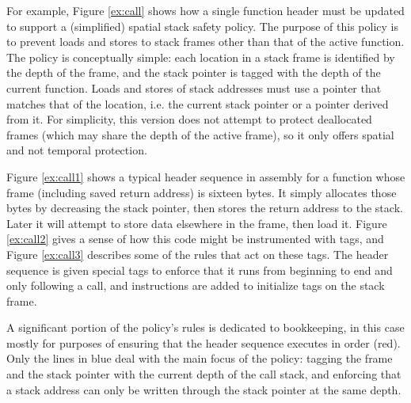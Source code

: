 \documentclass{report}
\begin{document}
For example, Figure \ref{ex:call} shows how a single function header must be updated to
support a (simplified) spatial stack safety policy. The purpose of this policy is to prevent
loads and stores to stack frames other than that of the active function.
The policy is conceptually simple:
each location in a stack frame is identified by the depth of the frame, and the stack pointer
is tagged with the depth of the current function.  Loads and stores of stack
addresses must use a pointer that matches that of the location, i.e. the current stack pointer
or a pointer derived from it. For simplicity, this version does not attempt to protect deallocated
frames (which may share the depth of the active frame), so it only offers spatial and not temporal
protection.

Figure \ref{ex:call1} shows a typical header sequence in assembly for a function whose frame
(including saved return address) is sixteen bytes. It simply allocates those bytes by decreasing
the stack pointer, then stores the return address to the stack. Later it will attempt to store data
elsewhere in the frame, then load it. Figure \ref{ex:call2} gives a sense of how
this code might be instrumented with tags, and Figure \ref{ex:call3} describes some of
the rules that act on these tags. The header sequence is given special tags to enforce
that it runs from beginning to end and only following a call, and instructions are added
to initialize tags on the stack frame.

A significant portion of the policy's rules is dedicated to bookkeeping, in this case
mostly for purposes of ensuring that the header sequence executes in order (red).
Only the lines in blue deal with the main focus of the policy:
tagging the frame and the stack pointer with the current depth of the call stack, and enforcing
that a stack address can only be written through the stack pointer at the same depth.
\end{document}
